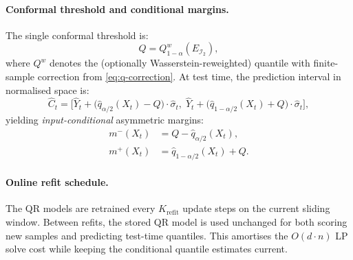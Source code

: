 \paragraph{Conformal threshold and conditional margins.}
The single conformal threshold is:
\begin{equation}\label{eq:cqr-Q}
  Q = Q_{1-\alpha}^{w}(E_{\mathcal{I}_2}),
\end{equation}
where $Q^w$ denotes the (optionally Wasserstein-reweighted) quantile
with finite-sample correction from \eqref{eq:q-correction}.  At test
time, the prediction interval in normalised space is:
\begin{equation}\label{eq:cqr-interval}
  \hat{C}_t = \bigl[\hat{Y}_t + \bigl(\hat{q}_{\alpha/2}(X_t) - Q\bigr)
    \cdot \hat{\sigma}_t,\;
  \hat{Y}_t + \bigl(\hat{q}_{1-\alpha/2}(X_t) + Q\bigr)
    \cdot \hat{\sigma}_t\bigr],
\end{equation}
yielding \emph{input-conditional} asymmetric margins:
\begin{align}\label{eq:cqr-margins}
  m^{-}(X_t) &= Q - \hat{q}_{\alpha/2}(X_t), \\
  m^{+}(X_t) &= \hat{q}_{1-\alpha/2}(X_t) + Q.
\end{align}

\paragraph{Online refit schedule.}
The QR models are retrained every $K_{\mathrm{refit}}$ update steps on
the current sliding window.  Between refits, the stored QR model is used
unchanged for both scoring new samples and predicting test-time
quantiles.  This amortises the $O(d \cdot n)$ LP solve cost while
keeping the conditional quantile estimates current.

